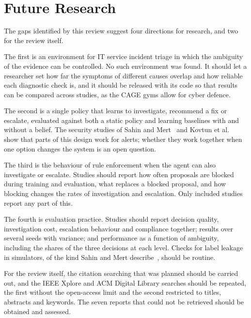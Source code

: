 \section{Future Research}
\label{sec:future}

The gaps identified by this review suggest four directions for research, and two for the review itself.

The first is an environment for IT service incident triage in which the ambiguity of the evidence can be controlled. No such environment was found. It should let a researcher set how far the symptoms of different causes overlap and how reliable each diagnostic check is, and it should be released with its code so that results can be compared across studies, as the CAGE gyms allow for cyber defence.

The second is a single policy that learns to investigate, recommend a fix or escalate, evaluated against both a static policy and learning baselines with and without a belief. The security studies of Sahin and Mert~\cite{sahin2026} and Kovtun et al.~\cite{kovtun2026} show that parts of this design work for alerts; whether they work together when one option changes the system is an open question.

The third is the behaviour of rule enforcement when the agent can also investigate or escalate. Studies should report how often proposals are blocked during training and evaluation, what replaces a blocked proposal, and how blocking changes the rates of investigation and escalation. Only \NBlocked{} included studies report any part of this.

The fourth is evaluation practice. Studies should report decision quality, investigation cost, escalation behaviour and compliance together; results over several seeds with variance; and performance as a function of ambiguity, including the shares of the three decisions at each level. Checks for label leakage in simulators, of the kind Sahin and Mert describe~\cite{sahin2026}, should be routine.

For the review itself, the citation searching that was planned should be carried out, and the IEEE Xplore and ACM Digital Library searches should be repeated, the first without the open-access limit and the second restricted to titles, abstracts and keywords. The seven reports that could not be retrieved should be obtained and assessed.
